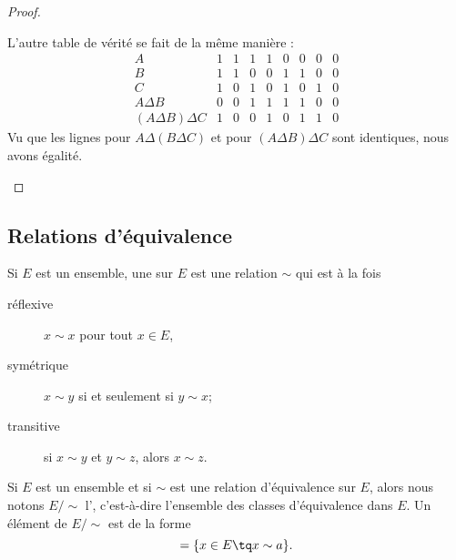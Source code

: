 \begin{proof}
\begin{subproof}
           L'autre table de vérité se fait de la même manière :
           \begin{equation}
               \begin{array}{|c|c|c|c|c|c|c|c|c|}
                   A&1&1&1&1&0&0&0&0\\
                   B&1&1&0&0&1&1&0&0\\
                   C&1&0&1&0&1&0&1&0\\
                   \hline%
           A\Delta B&0&0&1&1&1&1&0&0\\
           \hline%
(A\Delta B)\Delta C &1&0&0&1&0&1&1&0     
               \end{array}
           \end{equation}
           Vu que les lignes pour \( A\Delta (B\Delta C)\) et pour \( (A\Delta B)\Delta C\) sont identiques, nous avons égalité.
    \end{subproof}
\end{proof}

\subsection{Relations d'équivalence}
\label{appEquivalence}

\begin{definition}  \label{DefHoJzMp}
Si $E$ est un ensemble, une  sur $E$ est une relation $\sim$ qui est à la fois
\begin{description}
	\item[réflexive] $x\sim x$ pour tout $x\in E$,
	\item[symétrique] $x\sim y$ si et seulement si $y\sim x$;
	\item[transitive] si $x\sim y$ et $y\sim z$, alors $x\sim z$.
\end{description}
\end{definition}

\begin{definition}      \label{DEFooRHPSooHKBZXl}
    Si \( E\) est un ensemble et si \( \sim\) est une relation d'équivalence sur \( E\), alors nous notons \( E/\sim\) l', c'est-à-dire l'ensemble des classes d'équivalence dans \( E\). Un élément de \( E/\sim\) est de la forme
    \begin{equation}
        [a]=\{ x\in E\tq x\sim a \}.
    \end{equation}
\end{definition}

